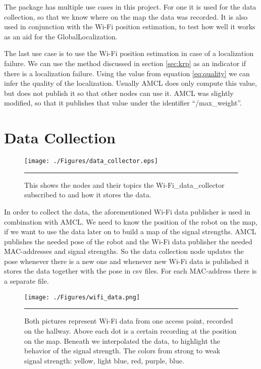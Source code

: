 The package has multiple use cases in this project. For one it is used for the data collection, so that we know where on the map the data was recorded. It is also used in conjunction with the Wi-Fi position estimation, to test how well it works as an aid for the \gls{GlobalLocalization}. 

The last use case is to use the Wi-Fi position estimation in case of a localization failure. We can use the method discussed in section \ref{sec:krp} as an indicator if there is a localization failure. Using the value from equation \ref{eq:quality} we can infer the quality of the localization. Usually AMCL does only compute this value, but does not publish it so that other nodes can use it. AMCL was slightly modified, so that it publishes that value under the identifier ``/max\_weight''.

\section{Data Collection}\label{sec:data_coll}
\begin{figure}[htbp]
	\centering
		\texttt{[image: ./Figures/data\_collector.eps]}
		\rule{35em}{0.5pt}
	\caption[Diagram of wifi\_data\_collector]{This shows the nodes and their topics the Wi-Fi\_data\_collector subscribed to and how it stores the data.}
	\label{fig:data_collector}
\end{figure}
In order to collect the data, the aforementioned Wi-Fi data publisher is used in combination with AMCL. We need to know the position of the robot on the map, if we want to use the data later on to build a map of the signal strengths. AMCL publishes the needed pose of the robot and the Wi-Fi data publisher the needed \Gls{MAC-address}es and signal strengths. So the data collection node updates the pose whenever there is a new one and whenever new Wi-Fi data is published it stores the data together with the pose in csv files. For each \Gls{MAC-address} there is a separate file.
\begin{figure}[htbp]
	\centering
		\texttt{[image: ./Figures/wifi\_data.png]}%
		\rule{35em}{0.5pt}
	\caption[Wi-Fi data]{Both pictures represent Wi-Fi data from one access point, recorded on the hallway. Above each dot is a certain recording at the position on the map. Beneath we interpolated the data, to highlight the behavior of the signal strength. The colors from strong to weak signal strength: yellow, light blue, red, purple, blue.}
	\label{fig:wifi_data}
\end{figure}
 
